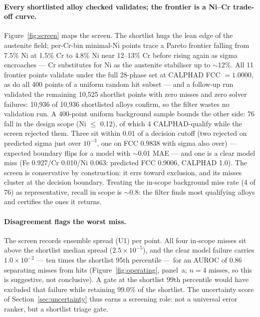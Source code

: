 \documentclass[preprint,12pt,authoryear]{elsarticle}
\begin{document}
\paragraph{Every shortlisted alloy checked validates; the frontier is a
Ni--Cr trade-off curve.}
Figure~\ref{fig:screen} maps the screen. The shortlist hugs the lean edge
of the austenite field; per-Cr-bin minimal-Ni points trace a Pareto
frontier falling from 7.5\% Ni at 1.5\% Cr to 4.8\% Ni near 12--13\% Cr
before rising again as sigma encroaches --- Cr substitutes for Ni as the
austenite stabiliser up to $\sim$12\%. All 11 frontier points validate
under the full 28-phase set at CALPHAD FCC $= 1.0000$, as do all 400
points of a uniform random hit subset --- and a follow-up run validated
the remaining 10{,}525 shortlist points with zero misses and zero solver
failures: 10{,}936 of 10{,}936 shortlisted alloys confirm, so the filter
wastes no validation run. A 400-point uniform
background sample bounds the other side: 76 fall in the design scope
(Ni $\le$ 0.12), of which 4 CALPHAD-qualify while the screen rejected
them. Three sit within 0.01 of a decision cutoff (two rejected on
predicted sigma just over $10^{-3}$, one on FCC $0.9838$ with sigma also
over) ---
expected boundary flips for a model with $\sim$0.01 MAE --- and one is a
clear model miss (Fe 0.927/Cr 0.010/Ni 0.063: predicted FCC 0.9006,
CALPHAD 1.0). The screen is conservative by construction: it errs toward
exclusion, and its misses cluster at the decision boundary. Treating the
in-scope background miss rate (4 of 76) as representative, recall in scope
is $\sim$0.8: the filter finds most qualifying alloys and certifies the
ones it returns.

\paragraph{Disagreement flags the worst miss.}
The screen records ensemble spread (U1) per point. All four in-scope
misses sit above the shortlist median spread ($2.5\times10^{-5}$), and
the clear model failure carries $1.0\times10^{-2}$ --- ten times the
shortlist 95th percentile --- for an AUROC of 0.86 separating misses
from hits (Figure~\ref{fig:operating}, panel~a; $n = 4$ misses, so this
is suggestive, not conclusive). A gate at the shortlist 99th percentile
would have excluded that failure while retaining 99.0\% of the
shortlist. The uncertainty score of Section~\ref{sec:uncertainty} thus
earns a screening role: not a universal error ranker, but a shortlist
triage gate.
\end{document}
